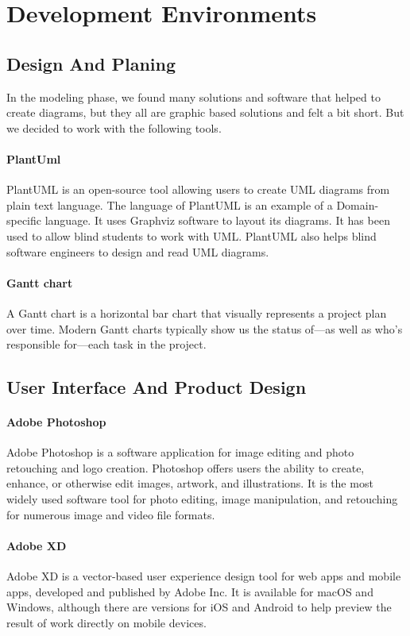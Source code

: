 \section{Development Environments}
\subsection{Design And Planing}
In the modeling phase, we found many solutions and software that helped to create diagrams, but they all are graphic based solutions and felt a bit short. But we decided to work with the following tools.

\paragraph*{PlantUml}
PlantUML is an open-source tool allowing users to create UML diagrams from plain text language. The language of PlantUML is an example of a Domain-specific language. It uses Graphviz software to layout its diagrams. It has been used to allow blind students to work with UML. PlantUML also helps blind software engineers to design and read UML diagrams.

\paragraph*{Gantt chart}
A Gantt chart is a horizontal bar chart that visually represents a project plan over time. Modern Gantt charts typically show us the status of—as well as who’s responsible for—each task in the project.


\subsection{User Interface And Product Design}
\paragraph*{Adobe Photoshop}
Adobe Photoshop is a software application for image editing and photo retouching and logo creation. Photoshop offers users the ability to create, enhance, or otherwise edit images, artwork, and illustrations. It is the most widely used software tool for photo editing, image manipulation, and retouching for numerous image and video file formats.

\paragraph*{Adobe XD}
Adobe XD is a vector-based user experience design tool for web apps and mobile apps, developed and published by Adobe Inc. It is available for macOS and Windows, although there are versions for iOS and Android to help preview the result of work directly on mobile devices.



